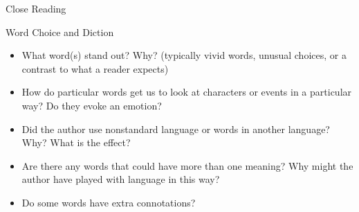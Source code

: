 \begin{frame}{Close Reading}
\begin{itemize}
\begin{itemize}
  \end{itemize}
  \end{itemize}
\end{frame}


\begin{frame}{Word Choice and Diction}

\begin{itemize}
\item What word(s) stand out? Why? (typically vivid words, unusual choices, or a contrast to what a reader expects)
\item How do particular words get us to look at characters or events in a particular way? Do they evoke an emotion?
\item Did the author use nonstandard language or words in another language? Why? What is the effect?
\item Are there any words that could have more than one meaning? Why might the author have played with language in this way?
\item Do some words have extra connotations?
\end{itemize}
\end{frame}


